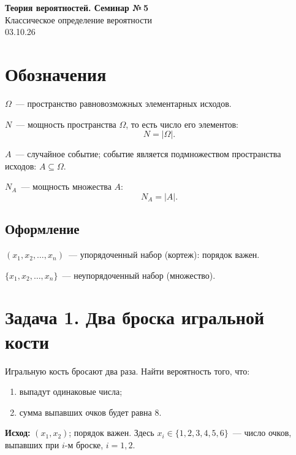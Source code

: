 



\begin{center}
  {\large\bfseries Теория вероятностей. Семинар №\,5}\\[4pt]
  {\large Классическое определение вероятности}\\[4pt]
  03.10.26
\end{center}

\section*{Обозначения}

$\Omega$~--- пространство равновозможных элементарных исходов.

$N$~--- мощность пространства $\Omega$, то есть число его элементов:
\[
  N=|\Omega|.
\]

$A$~--- случайное событие; событие является подмножеством
пространства исходов: $A\subseteq\Omega$.

$N_A$~--- мощность множества $A$:
\[
  N_A=|A|.
\]

\subsection*{Оформление}

$(x_1,x_2,\ldots,x_n)$~--- упорядоченный набор (кортеж): порядок важен.

$\{x_1,x_2,\ldots,x_n\}$~--- неупорядоченный набор (множество).

\section*{Задача 1. Два броска игральной кости}

Игральную кость бросают два раза. Найти вероятность того, что:
\begin{enumerate}
  \item выпадут одинаковые числа;
  \item сумма выпавших очков будет равна $8$.
\end{enumerate}

\textbf{Исход:} $(x_1,x_2)$; порядок важен.
Здесь $x_i\in\{1,2,3,4,5,6\}$~--- число очков,
выпавших при $i$-м броске, $i=1,2$.

